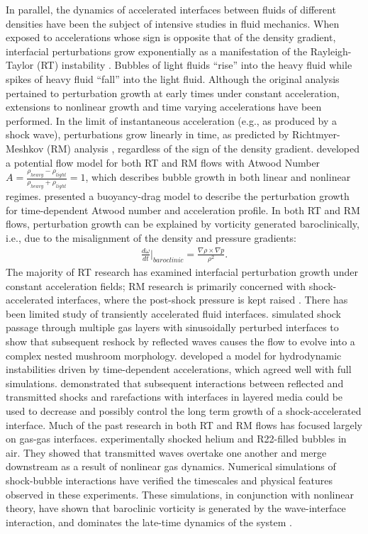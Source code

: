 In parallel, the dynamics of accelerated interfaces between fluids of different densities have
been the subject of intensive studies in fluid mechanics. When exposed
to accelerations whose sign is opposite that of the density gradient,
interfacial perturbations grow exponentially as a manifestation of the
Rayleigh-Taylor (RT) instability \citep{Taylor1950}. Bubbles of light fluids ``rise'' into the
heavy fluid while spikes of heavy fluid ``fall'' into the light
fluid. Although the original analysis pertained to perturbation growth
at early times under constant acceleration, extensions to nonlinear
growth and time varying accelerations have been performed. In the
limit of instantaneous acceleration (e.g., as produced by a shock
wave), perturbations grow linearly in time, as predicted by
Richtmyer-Meshkov (RM) analysis \citep{Richtmyer1960, Meshkov1969},
regardless of the sign of the density gradient. \cite{Hecht1994}
developed a potential flow model for both RT and RM flows with Atwood
Number
$A=\frac{\rho_{heavy}-\rho_{light}}{\rho_{heavy}+\rho_{light}}=1$,
which describes bubble growth in both linear and nonlinear
regimes. \cite{Srebro2003} presented a buoyancy-drag model to describe
the perturbation growth for time-dependent Atwood number and
acceleration profile. In both RT and RM
flows, perturbation growth can be explained by vorticity generated
baroclinically, i.e., due to the misalignment of the density and
pressure gradients:
\begin{align}
  \label{eq:baroclinic_equation}
  \frac{d\omega}{dt} \biggr\rvert_{baroclinic} = \frac{\nabla \rho \times \nabla p}{\rho^2}.%
\end{align}
The majority of RT research has examined interfacial perturbation
growth under constant acceleration fields; RM research is primarily
concerned with shock-accelerated interfaces, where the
post-shock pressure is kept raised \citep{Brouillette2002}. There has been
limited study of transiently accelerated fluid
interfaces. \cite{Mikaelian1996} simulated shock passage through
multiple gas layers with sinusoidally perturbed interfaces to show
that subsequent reshock by reflected waves causes the flow to evolve
into a complex nested mushroom morphology. \cite{Mikaelian2009}
developed a model for hydrodynamic instabilities driven by
time-dependent accelerations, which agreed well with full
simulations. \cite{HenrydeFrahan2015b} demonstrated that subsequent
interactions between reflected and transmitted
shocks and rarefactions with interfaces in layered media could be used to decrease and
possibly control the long term growth of a shock-accelerated
interface.
Much of the past research in both RT and RM flows has
focused largely on gas-gas interfaces. \cite{Haas1987} experimentally
shocked helium and R22-filled bubbles in air. They showed that
transmitted waves overtake one another and merge downstream as a
result of nonlinear gas dynamics. Numerical simulations of
shock-bubble interactions have verified the timescales and physical
features observed in these experiments. These simulations, in
conjunction with nonlinear theory, have shown that baroclinic
vorticity is generated by the wave-interface interaction, and
dominates the late-time dynamics of the system
\citep{Picone1988,Quirk1996}.

